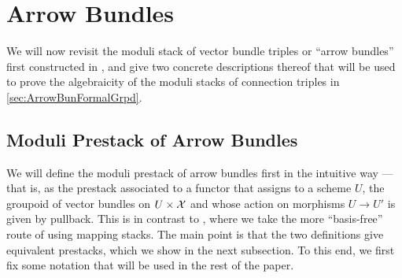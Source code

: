 \documentclass[11pt]{amsart}
\begin{document}

\section{Arrow Bundles}\label{sec:ArrowBun}

We will now revisit the moduli stack of vector bundle triples or
``arrow bundles'' first constructed in \cite{ModQuivBun},
and give two concrete descriptions thereof that will be
used to prove the algebraicity of the moduli stacks of connection triples
in \cref{sec:ArrowBunFormalGrpd}.

\subsection{Moduli Prestack of Arrow Bundles}

We will define the moduli prestack of arrow bundles first in the intuitive
way --- that is, as the prestack associated to a functor that assigns
to a scheme $U$, the groupoid of vector bundles on $U \times \mathcal{X}$ and whose
action on morphisms $U \to U'$ is given by pullback. This is in contrast
to \cite{ModQuivBun}, where we take the more ``basis-free'' route of using
mapping stacks. The main point is that the two definitions give equivalent
prestacks, which we show in the next subsection. To this end, we first fix some
notation that will be used in the rest of the paper.
\end{document}
